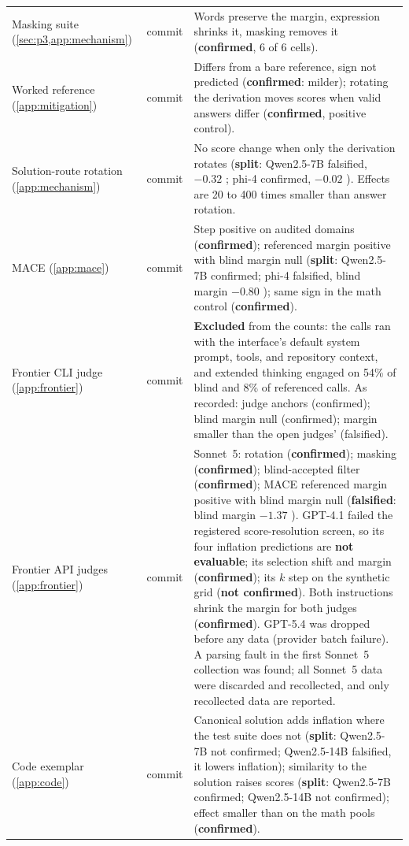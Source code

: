 {\begin{longtable}{L{3.2cm}L{1.1cm}L{8.7cm}}
Masking suite (\cref{sec:p3,app:mechanism}) & commit & Words preserve the margin, expression shrinks it, masking removes it (\textbf{confirmed}, 6 of 6 cells). \\
Worked reference (\cref{app:mitigation}) & commit & Differs from a bare reference, sign not predicted (\textbf{confirmed}: milder); rotating the derivation moves scores when valid answers differ (\textbf{confirmed}, positive control). \\
Solution-route rotation (\cref{app:mechanism}) & commit & No score change when only the derivation rotates (\textbf{split}: Qwen2.5-7B falsified, $-0.32$ ; phi-4 confirmed, $-0.02$ ). Effects are 20 to 400 times smaller than answer rotation. \\
\textsc{MACE} (\cref{app:mace}) & commit & Step positive on audited domains (\textbf{confirmed}); referenced margin positive with blind margin null (\textbf{split}: Qwen2.5-7B confirmed; phi-4 falsified, blind margin $-0.80$ ); same sign in the math control (\textbf{confirmed}). \\
Frontier CLI judge (\cref{app:frontier}) & commit & \textbf{Excluded} from the counts: the calls ran with the interface's default system prompt, tools, and repository context, and extended thinking engaged on 54\% of blind and 8\% of referenced calls. As recorded: judge anchors (confirmed); blind margin null (confirmed); margin smaller than the open judges' (falsified). \\
Frontier API judges (\cref{app:frontier}) & commit & Sonnet~5: rotation (\textbf{confirmed}); masking (\textbf{confirmed}); blind-accepted filter (\textbf{confirmed}); \textsc{MACE} referenced margin positive with blind margin null (\textbf{falsified}: blind margin $-1.37$ ). GPT-4.1 failed the registered score-resolution screen, so its four inflation predictions are \textbf{not evaluable}; its selection shift and margin (\textbf{confirmed}); its $k$ step on the synthetic grid (\textbf{not confirmed}). Both instructions shrink the margin for both judges (\textbf{confirmed}). GPT-5.4 was dropped before any data (provider batch failure). A parsing fault in the first Sonnet~5 collection was found; all Sonnet~5 data were discarded and recollected, and only recollected data are reported. \\
Code exemplar (\cref{app:code}) & commit & Canonical solution adds inflation where the test suite does not (\textbf{split}: Qwen2.5-7B not confirmed; Qwen2.5-14B falsified, it lowers inflation); similarity to the solution raises scores (\textbf{split}: Qwen2.5-7B confirmed; Qwen2.5-14B not confirmed); effect smaller than on the math pools (\textbf{confirmed}). \\

\end{longtable}}
